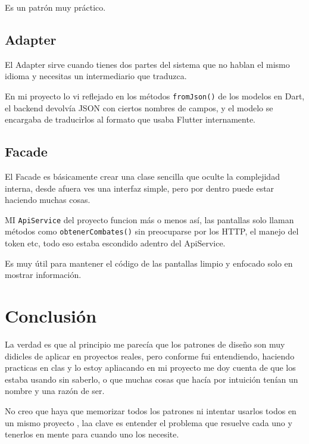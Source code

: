 \documentclass{article}
\begin{document}
Es un patr\'on muy pr\'actico.

\subsection{Adapter}

El Adapter sirve cuando tienes dos partes del sistema que no hablan el
mismo idioma y necesitas un intermediario que traduzca.

En mi proyecto lo vi reflejado en los m\'etodos \texttt{fromJson()} de los
modelos en Dart, el backend devolv\'ia JSON con ciertos nombres de campos,
y el modelo se encargaba de traducirlos al formato que usaba Flutter
internamente.

\subsection{Facade}

El Facade es b\'asicamente crear una clase sencilla que oculte la
complejidad interna, desde afuera ves una interfaz simple, pero por
dentro puede estar haciendo muchas cosas.

MI \texttt{ApiService} del proyecto funcion m\'as o menos as\'i, las
pantallas solo llaman m\'etodos como \texttt{obtenerCombates()} sin
preocuparse por los  HTTP, el manejo del token etc, 
todo eso estaba escondido adentro del ApiService.

Es muy \'util para mantener el c\'odigo de las pantallas limpio y enfocado
solo en mostrar informaci\'on.







\section{Conclusi\'on}

La verdad es que al principio me parec\'ia que los patrones de dise\~no son muy didicles de aplicar en proyectos reales, pero conforme fui entendiendo, haciendo practicas en clas y lo estoy apliacando en mi proyecto
me doy cuenta de que los estaba usando sin saberlo, o que muchas
cosas que hac\'ia por intuici\'on ten\'ian un nombre y una raz\'on de ser.

No creo que haya que memorizar todos los patrones ni intentar usarlos
todos en un mismo proyecto , laa clave es entender el problema que resuelve
cada uno y tenerlos en mente para cuando uno los necesite.
\end{document}

